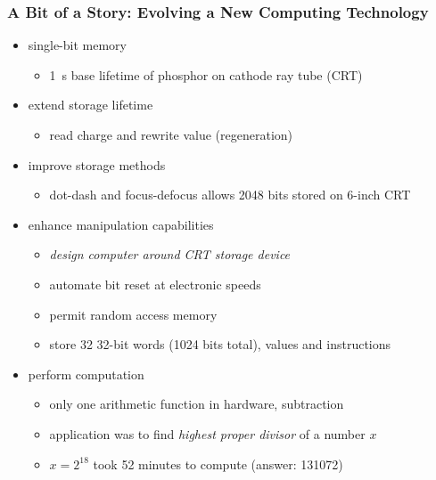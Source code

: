 \begin{frame}
  \frametitle{A Bit of a Story: Evolving a New Computing Technology}
  \begin{itemize}[<+->]
  \item  single-bit memory 
    \begin{itemize}[<6->]
    \item \SI{1}{\second} base lifetime of phosphor on cathode ray tube (CRT)
    \end{itemize}
  \item  extend storage lifetime 
    \begin{itemize}[<6->]
    \item read charge and rewrite value (regeneration)
    \end{itemize}
  \item improve storage methods 
    \begin{itemize}[<6->]
    \item dot-dash and focus-defocus allows 2048 bits stored on 6-inch CRT
    \end{itemize}
  \item enhance manipulation capabilities 
    \begin{itemize}[<6->]
    \item \textcolor{orange!80!black}{\emph{design computer around CRT storage device}}
    \item automate bit reset at electronic speeds 
    \item permit random access memory
    \item store 32 32-bit words (1024 bits total), values and instructions
    \end{itemize}
  \item perform computation 
    \begin{itemize}[<6->]
    \item only one arithmetic function in hardware, subtraction
    \item application was to find \emph{highest proper divisor} of a number $x$
    \item $x=2^{18}$ took 52 minutes to compute (answer: \num{131072})
    \end{itemize}
  \end{itemize}
\end{frame}